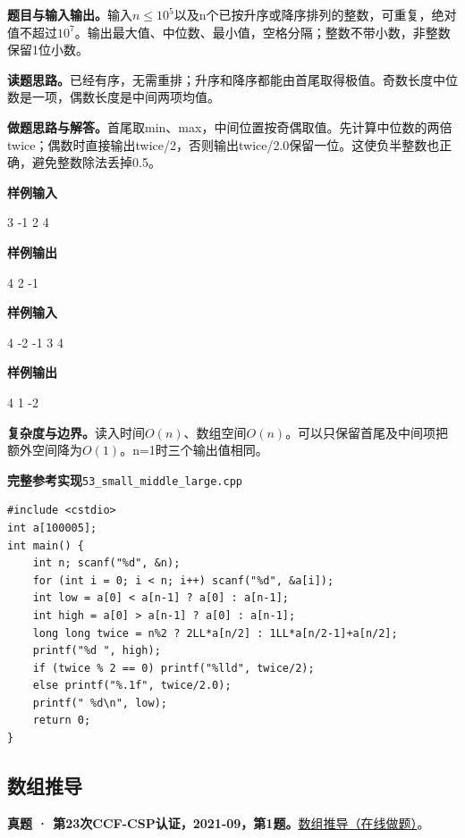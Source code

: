 \documentclass[UTF8,11pt,a4paper,fontset=none]{ctexart}
\begin{document}
\noindent\textbf{题目与输入输出。}输入$n\le10^5$以及n个已按升序或降序排列的整数，可重复，绝对值不超过$10^7$。输出最大值、中位数、最小值，空格分隔；整数不带小数，非整数保留1位小数。

\noindent\textbf{读题思路。}已经有序，无需重排；升序和降序都能由首尾取得极值。奇数长度中位数是一项，偶数长度是中间两项均值。

\noindent\textbf{做题思路与解答。}首尾取min、max，中间位置按奇偶取值。先计算中位数的两倍twice；偶数时直接输出twice/2，否则输出twice/2.0保留一位。这使负半整数也正确，避免整数除法丢掉0.5。
\begin{tcolorbox}[samplebox,title={输入输出样例}]
\textbf{样例输入}
\begin{Sample}
3
-1 2 4
\end{Sample}
\tcblower
\textbf{样例输出}
\begin{Sample}
4 2 -1
\end{Sample}
\end{tcolorbox}
\begin{tcolorbox}[samplebox,title={输入输出样例}]
\textbf{样例输入}
\begin{Sample}
4
-2 -1 3 4
\end{Sample}
\tcblower
\textbf{样例输出}
\begin{Sample}
4 1 -2
\end{Sample}
\end{tcolorbox}

\noindent\textbf{复杂度与边界。}读入时间$O(n)$、数组空间$O(n)$。可以只保留首尾及中间项把额外空间降为$O(1)$。n=1时三个输出值相同。
\par\noindent\begin{minipage}{\linewidth}
\textbf{完整参考实现}\quad\texttt{53\_small\_middle\_large.cpp}
\begin{lstlisting}
#include <cstdio>
int a[100005];
int main() {
    int n; scanf("%d", &n);
    for (int i = 0; i < n; i++) scanf("%d", &a[i]);
    int low = a[0] < a[n-1] ? a[0] : a[n-1];
    int high = a[0] > a[n-1] ? a[0] : a[n-1];
    long long twice = n%2 ? 2LL*a[n/2] : 1LL*a[n/2-1]+a[n/2];
    printf("%d ", high);
    if (twice % 2 == 0) printf("%lld", twice/2);
    else printf("%.1f", twice/2.0);
    printf(" %d\n", low);
    return 0;
}
\end{lstlisting}
\end{minipage}\par

\subsection{数组推导}
\textbf{真题 · 第23次CCF-CSP认证，2021-09，第1题。}\href{https://www.acwing.com/problem/content/4009/}{数组推导（在线做题）}。
\end{document}
